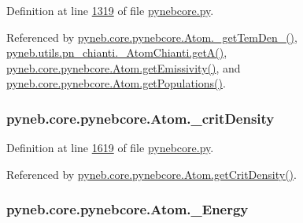Definition at line \hyperlink{pynebcore_8py_source_l01319}{1319} of file \hyperlink{pynebcore_8py_source}{pynebcore.\-py}.



Referenced by \hyperlink{pynebcore_8py_source_l01869}{pyneb.\-core.\-pynebcore.\-Atom.\-\_\-get\-Tem\-Den\-\_()}, \hyperlink{pn__chianti_8py_source_l00316}{pyneb.\-utils.\-pn\-\_\-chianti.\-\_\-\-Atom\-Chianti.\-get\-A()}, \hyperlink{pynebcore_8py_source_l01782}{pyneb.\-core.\-pynebcore.\-Atom.\-get\-Emissivity()}, and \hyperlink{pynebcore_8py_source_l01562}{pyneb.\-core.\-pynebcore.\-Atom.\-get\-Populations()}.

\hypertarget{classpyneb_1_1core_1_1pynebcore_1_1_atom_a1d0823a36ca030fd149522fe72908631}{
\subsubsection[{\-\_\-crit\-Density}]{\setlength{\rightskip}{0pt plus 5cm}pyneb.\-core.\-pynebcore.\-Atom.\-\_\-crit\-Density\hspace{0.3cm}{\ttfamily [private]}}}\label{classpyneb_1_1core_1_1pynebcore_1_1_atom_a1d0823a36ca030fd149522fe72908631}


Definition at line \hyperlink{pynebcore_8py_source_l01619}{1619} of file \hyperlink{pynebcore_8py_source}{pynebcore.\-py}.



Referenced by \hyperlink{pynebcore_8py_source_l01759}{pyneb.\-core.\-pynebcore.\-Atom.\-get\-Crit\-Density()}.

\hypertarget{classpyneb_1_1core_1_1pynebcore_1_1_atom_a52e68715246d258bf0a14f4bd06e89e4}{
\subsubsection[{\-\_\-\-Energy}]{\setlength{\rightskip}{0pt plus 5cm}pyneb.\-core.\-pynebcore.\-Atom.\-\_\-\-Energy\hspace{0.3cm}{\ttfamily [private]}}}\label{classpyneb_1_1core_1_1pynebcore_1_1_atom_a52e68715246d258bf0a14f4bd06e89e4}


